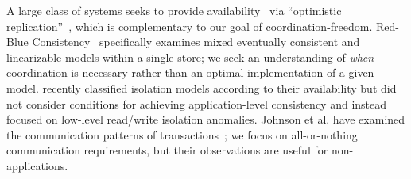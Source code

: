  A large class of systems
seeks to provide availability~\cite{gilbert-cap} via ``optimistic
replication''~\cite{optimistic}, which is complementary to our goal of
coordination-freedom. Red-Blue Consistency~\cite{redblue} specifically
examines mixed eventually consistent and linearizable models within a
single store; we seek an understanding of \textit{when} coordination
is necessary rather than an optimal implementation of a given
model. \cite{hat-vldb} recently classified isolation models according
to their availability but did not consider conditions for achieving
application-level consistency and instead focused on low-level
read/write isolation anomalies.  Johnson et al. have examined the
communication patterns of transactions~\cite{shore-communication}; we
focus on all-or-nothing communication requirements, but their
observations are useful for non-\iconfluent applications.

